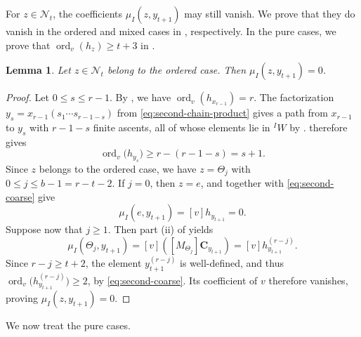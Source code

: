 \documentclass[11pt,a4paper,reqno]{amsart}
\numberwithin{equation}{section}
\newtheorem{lemma}[theorem]{Lemma}
\theoremstyle{definition}
\theoremstyle{remark}
\theoremstyle{plain}
\newcommand{\C}{\mathbf C}
\newcommand{\ord}{\operatorname{ord}_v}
\newcommand{\mus}{\mu_I}
\begin{document}
For $z\in\mathcal N_t$, the coefficients $\mus(z,y_{t+1})$ may still vanish.
We prove that they do vanish in the ordered and mixed cases in , respectively.
In the pure cases, we prove that $\ord(h_z)\geq t+3$ in .

\begin{lemma}\label{lem:second-coarse}
Let $z\in \mathcal N_t$ belong to the ordered case.
Then $\mus(z,y_{t+1})=0$.
\end{lemma}
\begin{proof}
Let $0\leq s\leq r-1$.
By , we have $\ord(h_{x_{r-1}})=r$.
The factorization $y_s = x_{r-1}(s_1\cdots s_{r-1-s})$ from \eqref{eq:second-chain-product} gives a path from
$x_{r-1}$ to $y_s$ with $r-1-s$ finite ascents, all of whose elements lie in $ {}^IW$ by .
 therefore gives
\begin{equation}\label{eq:second-coarse}
\ord\bigl(h_{y_s}\bigr)\geq r-(r-1-s)=s+1.  
\end{equation}
Since $z$ belongs to the ordered case, we have $z=\Theta_j$ with $0\leq j\leq b-1=r-t-2$.
If $j=0$, then $z=e$, and  together with \cref{eq:second-coarse} give
\[
 \mus(e,y_{t+1})=[v]h_{y_{t+1}}=0.
\]
Suppose now that $j\geq1$.
Then part (ii) of  yields
\[
\mus(\Theta_j,y_{t+1})=
[v]\left([M_{\Theta_j}]\C_{y_{t+1}}\right)=
[v]h_{y_{t+1}}^{(r-j)}.
\]
Since $r-j\geq t+2$, the element $y_{t+1}^{(r-j)}$ is well-defined, and thus $\ord\bigl(h_{y_{t+1}}^{(r-j)}\bigr)\geq2$, by \cref{eq:second-coarse}.
Its coefficient of $v$ therefore vanishes, proving $\mus(z,y_{t+1})=0$.
\end{proof}

We now treat the pure cases.
\end{document}
